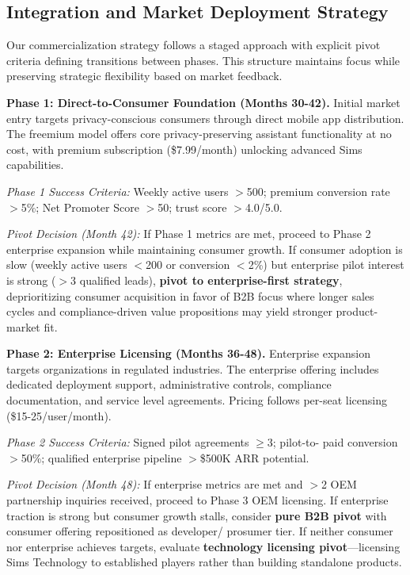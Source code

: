 \documentclass[11pt]{article}
\begin{document}
\vspace*{-8pt}
\subsection{Integration and Market Deployment Strategy}
\vspace*{-8pt}
Our commercialization strategy follows a staged approach with explicit pivot 
criteria defining transitions between phases. This structure maintains focus 
while preserving strategic flexibility based on market feedback.

\textbf{Phase 1: Direct-to-Consumer Foundation (Months 30-42).}
Initial market entry targets privacy-conscious consumers through direct mobile 
app distribution. The freemium model offers core privacy-preserving assistant 
functionality at no cost, with premium subscription (\$7.99/month) unlocking 
advanced Sims capabilities.

\textit{Phase 1 Success Criteria:} Weekly active users $>$500; premium 
conversion rate $>$5\%; Net Promoter Score $>$50; trust score $>$4.0/5.0.

\textit{Pivot Decision (Month 42):} If Phase 1 metrics are met, proceed to 
Phase 2 enterprise expansion while maintaining consumer growth. If consumer 
adoption is slow (weekly active users $<$200 or conversion $<$2\%) but 
enterprise pilot interest is strong ($>$3 qualified leads), \textbf{pivot to 
enterprise-first strategy}, deprioritizing consumer acquisition in favor of 
B2B focus where longer sales cycles and compliance-driven value propositions 
may yield stronger product-market fit.

\textbf{Phase 2: Enterprise Licensing (Months 36-48).}
Enterprise expansion targets organizations in regulated industries. The 
enterprise offering includes dedicated deployment support, administrative 
controls, compliance documentation, and service level agreements. Pricing 
follows per-seat licensing (\$15-25/user/month).

\textit{Phase 2 Success Criteria:} Signed pilot agreements $\geq$3; pilot-to-
paid conversion $>$50\%; qualified enterprise pipeline $>$\$500K ARR potential.

\textit{Pivot Decision (Month 48):} If enterprise metrics are met and $>$2 
OEM partnership inquiries received, proceed to Phase 3 OEM licensing. If 
enterprise traction is strong but consumer growth stalls, consider 
\textbf{pure B2B pivot} with consumer offering repositioned as developer/
prosumer tier. If neither consumer nor enterprise achieves targets, evaluate 
\textbf{technology licensing pivot}---licensing Sims Technology to established 
players rather than building standalone products.
\end{document}
